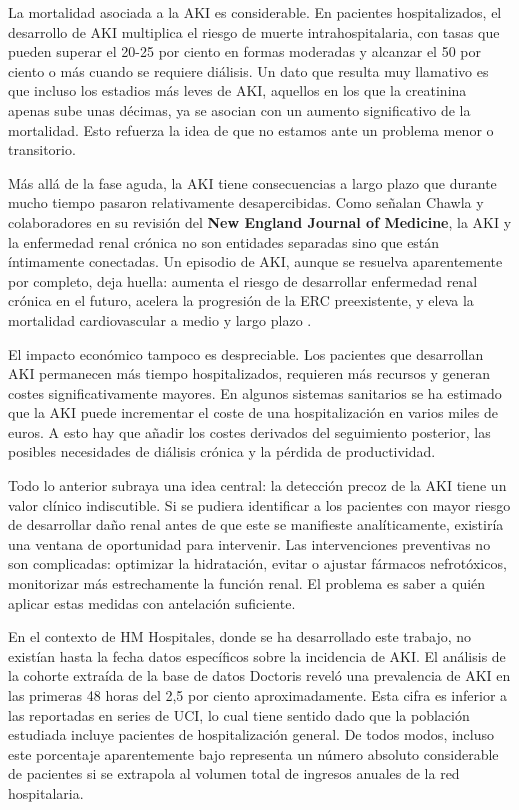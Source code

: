 \documentclass[12pt, a4paper, oneside]{report}
\begin{document}
La mortalidad asociada a la AKI es considerable. En pacientes hospitalizados, el desarrollo de AKI multiplica el riesgo de muerte intrahospitalaria, con tasas que pueden superar el 20-25 por ciento en formas moderadas y alcanzar el 50 por ciento o más cuando se requiere diálisis. Un dato que resulta muy llamativo es que incluso los estadios más leves de AKI, aquellos en los que la creatinina apenas sube unas décimas, ya se asocian con un aumento significativo de la mortalidad. Esto refuerza la idea de que no estamos ante un problema menor o transitorio.

Más allá de la fase aguda, la AKI tiene consecuencias a largo plazo que durante mucho tiempo pasaron relativamente desapercibidas. Como señalan Chawla y colaboradores en su revisión del \textbf{New England Journal of Medicine}, la AKI y la enfermedad renal crónica no son entidades separadas sino que están íntimamente conectadas. Un episodio de AKI, aunque se resuelva aparentemente por completo, deja huella: aumenta el riesgo de desarrollar enfermedad renal crónica en el futuro, acelera la progresión de la ERC preexistente, y eleva la mortalidad cardiovascular a medio y largo plazo \parencite{chawla2014akickd}.

El impacto económico tampoco es despreciable. Los pacientes que desarrollan AKI permanecen más tiempo hospitalizados, requieren más recursos y generan costes significativamente mayores. En algunos sistemas sanitarios se ha estimado que la AKI puede incrementar el coste de una hospitalización en varios miles de euros. A esto hay que añadir los costes derivados del seguimiento posterior, las posibles necesidades de diálisis crónica y la pérdida de productividad.

Todo lo anterior subraya una idea central: la detección precoz de la AKI tiene un valor clínico indiscutible. Si se pudiera identificar a los pacientes con mayor riesgo de desarrollar daño renal antes de que este se manifieste analíticamente, existiría una ventana de oportunidad para intervenir. Las intervenciones preventivas no son complicadas: optimizar la hidratación, evitar o ajustar fármacos nefrotóxicos, monitorizar más estrechamente la función renal. El problema es saber a quién aplicar estas medidas con antelación suficiente.

En el contexto de HM Hospitales, donde se ha desarrollado este trabajo, no existían hasta la fecha datos específicos sobre la incidencia de AKI. El análisis de la cohorte extraída de la base de datos Doctoris reveló una prevalencia de AKI en las primeras 48 horas del 2,5 por ciento aproximadamente. Esta cifra es inferior a las reportadas en series de UCI, lo cual tiene sentido dado que la población estudiada incluye pacientes de hospitalización general. De todos modos, incluso este porcentaje aparentemente bajo representa un número absoluto considerable de pacientes si se extrapola al volumen total de ingresos anuales de la red hospitalaria.
\end{document}
